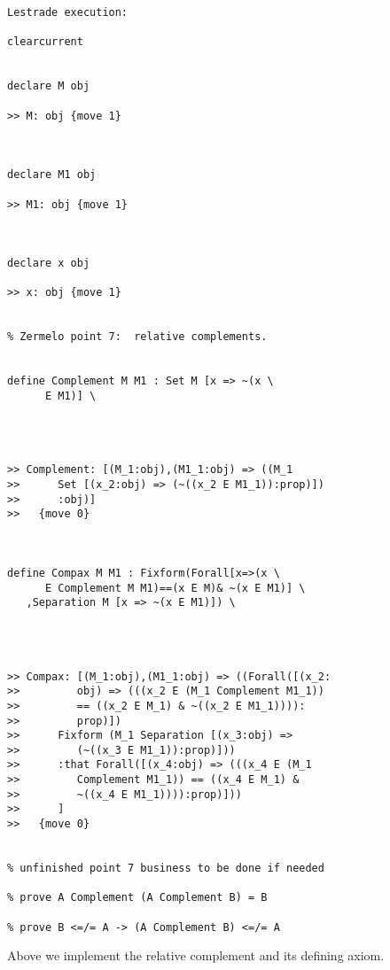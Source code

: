 \documentclass[12pt]{article}
\begin{document}
\begin{verbatim}Lestrade execution:

clearcurrent


declare M obj

>> M: obj {move 1}



declare M1 obj

>> M1: obj {move 1}



declare x obj

>> x: obj {move 1}


% Zermelo point 7:  relative complements.


define Complement M M1 : Set M [x => ~(x \
      E M1)] \
   



>> Complement: [(M_1:obj),(M1_1:obj) => ((M_1
>>      Set [(x_2:obj) => (~((x_2 E M1_1)):prop)])
>>      :obj)]
>>   {move 0}



define Compax M M1 : Fixform(Forall[x=>(x \
      E Complement M M1)==(x E M)& ~(x E M1)] \
   ,Separation M [x => ~(x E M1)]) \
   



>> Compax: [(M_1:obj),(M1_1:obj) => ((Forall([(x_2:
>>         obj) => (((x_2 E (M_1 Complement M1_1))
>>         == ((x_2 E M_1) & ~((x_2 E M1_1)))):
>>         prop)])
>>      Fixform (M_1 Separation [(x_3:obj) =>
>>         (~((x_3 E M1_1)):prop)]))
>>      :that Forall([(x_4:obj) => (((x_4 E (M_1
>>         Complement M1_1)) == ((x_4 E M_1) &
>>         ~((x_4 E M1_1)))):prop)]))
>>      ]
>>   {move 0}


% unfinished point 7 business to be done if needed

% prove A Complement (A Complement B) = B

% prove B <=/= A -> (A Complement B) <=/= A

\end{verbatim}

Above we implement the relative complement and its defining axiom.
\end{document}
